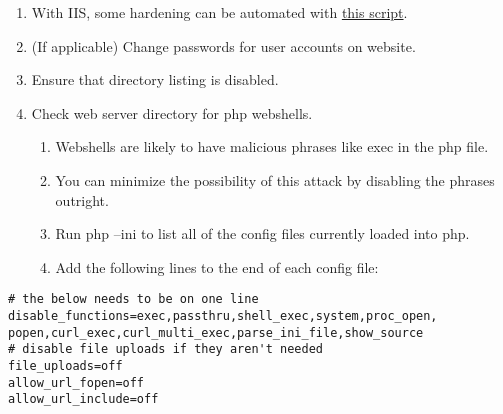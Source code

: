 \documentclass[12pt,letterpaper]{article}
\begin{document}
\begin{enumerate}
	\item With IIS, some hardening can be automated with \href{https://github.com/ufsitblue/blue/blob/main/dsu_blue/windows/IIS.ps1}{this script}.
	\item (If applicable) Change passwords for user accounts on website.
	\item Ensure that directory listing is disabled.
	\item Check web server directory for php webshells.
	\begin{enumerate}
		\item Webshells are likely to have malicious phrases like exec in the php file.
		\item You can minimize the possibility of this attack by disabling the phrases outright.
		\item Run php --ini to list all of the config files currently loaded into php.
		\item Add the following lines to the end of each config file:
	\end{enumerate}
\end{enumerate}

{ \color{iris} \begin{verbatim}
# the below needs to be on one line
disable_functions=exec,passthru,shell_exec,system,proc_open,
popen,curl_exec,curl_multi_exec,parse_ini_file,show_source
# disable file uploads if they aren't needed
file_uploads=off
allow_url_fopen=off
allow_url_include=off
\end{verbatim} }
\end{document}
